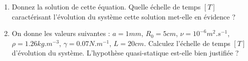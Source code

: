 {\begin{enumerate}
\item Donnez la solution de cette équation. Quelle échelle de temps $[T]$ caractérisant l'évolution du système cette solution met-elle en évidence ?


\item
On donne les valeurs suivantes : $a = 1mm$, $R_0 = 5cm$, $\nu = 10^{-6} m^2. s^{-1}$, 
$\rho = 1.26 kg. m^{-3}$, $\gamma = 0.07 N.m^{-1}$, $L=20cm$. Calculez l'échelle de temps $[T]$ d'évolution du système. 
L'hypothèse quasi-statique est-elle bien justifiée ?

\end{enumerate}
  }
 





